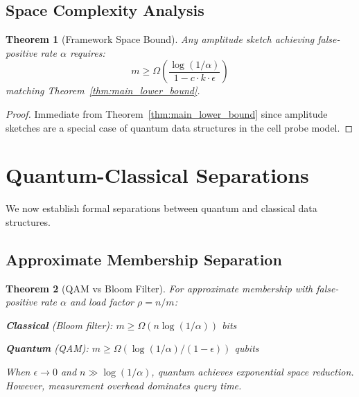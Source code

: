 \documentclass[11pt,letterpaper]{article}
\newtheorem{theorem}{Theorem}
\begin{document}
\subsection{Space Complexity Analysis}

\begin{theorem}[Framework Space Bound]
\label{thm:framework_space}
Any amplitude sketch achieving false-positive rate $\alpha$ requires:
\begin{equation}
m \geq \Omega\left(\frac{\log(1/\alpha)}{1-c \cdot k \cdot \epsilon}\right)
\end{equation}
matching Theorem~\ref{thm:main_lower_bound}.
\end{theorem}

\begin{proof}
Immediate from Theorem~\ref{thm:main_lower_bound} since amplitude sketches are a special case of quantum data structures in the cell probe model.
\end{proof}

\section{Quantum-Classical Separations}
\label{sec:separations}

We now establish formal separations between quantum and classical data structures.

\subsection{Approximate Membership Separation}

\begin{theorem}[QAM vs Bloom Filter]
\label{thm:qam_separation}
For approximate membership with false-positive rate $\alpha$ and load factor $\rho = n/m$:

\textbf{Classical} (Bloom filter): $m \geq \Omega(n \log(1/\alpha))$ bits

\textbf{Quantum} (QAM): $m \geq \Omega(\log(1/\alpha)/(1-\epsilon))$ qubits

When $\epsilon \to 0$ and $n \gg \log(1/\alpha)$, quantum achieves exponential space reduction. However, measurement overhead dominates query time.
\end{theorem}
\end{document}
